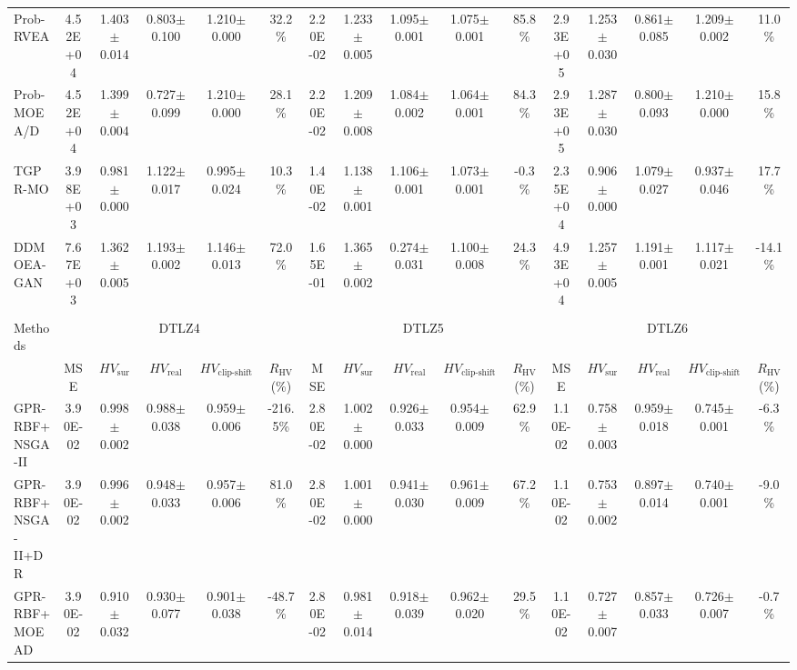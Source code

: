 \begin{table}[htbp]
{\begin{tabular}{l c c c c c c c c c c c c c c c}
Prob-RVEA & 4.52E+04 & 1.403$\pm$0.014 & 0.803$\pm$0.100 & 1.210$\pm$0.000 & 32.2\% & 2.20E-02 & 1.233$\pm$0.005 & 1.095$\pm$0.001 & 1.075$\pm$0.001 & 85.8\% & 2.93E+05 & 1.253$\pm$0.030 & 0.861$\pm$0.085 & 1.209$\pm$0.002 & 11.0\% \\
Prob-MOEA/D & 4.52E+04 & 1.399$\pm$0.004 & 0.727$\pm$0.099 & 1.210$\pm$0.000 & 28.1\% & 2.20E-02 & 1.209$\pm$0.008 & 1.084$\pm$0.002 & 1.064$\pm$0.001 & 84.3\% & 2.93E+05 & 1.287$\pm$0.030 & 0.800$\pm$0.093 & 1.210$\pm$0.000 & 15.8\% \\
TGPR-MO & 3.98E+03 & 0.981$\pm$0.000 & 1.122$\pm$0.017 & 0.995$\pm$0.024 & 10.3\% & 1.40E-02 & 1.138$\pm$0.001 & 1.106$\pm$0.001 & 1.073$\pm$0.001 & -0.3\% & 2.35E+04 & 0.906$\pm$0.000 & 1.079$\pm$0.027 & 0.937$\pm$0.046 & 17.7\% \\
DDMOEA-GAN & 7.67E+03 & 1.362$\pm$0.005 & 1.193$\pm$0.002 & 1.146$\pm$0.013 & 72.0\% & 1.65E-01 & 1.365$\pm$0.002 & 0.274$\pm$0.031 & 1.100$\pm$0.008 & 24.3\% & 4.93E+04 & 1.257$\pm$0.005 & 1.191$\pm$0.001 & 1.117$\pm$0.021 & -14.1\% \\
\hline
\multicolumn{16}{c}{} \\
\hline
Methods & \multicolumn{5}{c}{DTLZ4} & \multicolumn{5}{c}{DTLZ5} & \multicolumn{5}{c}{DTLZ6} \\
\cmidrule(lr){2-6} \cmidrule(lr){7-11} \cmidrule(lr){12-16}
 & MSE & $HV_{\mathrm{sur}}$ & $HV_{\mathrm{real}}$ & $HV_{\mathrm{clip\text{-}shift}}$ & $R_{\mathrm{HV}}$ (\%) & MSE & $HV_{\mathrm{sur}}$ & $HV_{\mathrm{real}}$ & $HV_{\mathrm{clip\text{-}shift}}$ & $R_{\mathrm{HV}}$ (\%) & MSE & $HV_{\mathrm{sur}}$ & $HV_{\mathrm{real}}$ & $HV_{\mathrm{clip\text{-}shift}}$ & $R_{\mathrm{HV}}$ (\%) \\
\hline
GPR-RBF+NSGA-II & 3.90E-02 & 0.998$\pm$0.002 & 0.988$\pm$0.038 & 0.959$\pm$0.006 & -216.5\% & 2.80E-02 & 1.002$\pm$0.000 & 0.926$\pm$0.033 & 0.954$\pm$0.009 & 62.9\% & 1.10E-02 & 0.758$\pm$0.003 & 0.959$\pm$0.018 & 0.745$\pm$0.001 & -6.3\% \\
GPR-RBF+NSGA-II+DR & 3.90E-02 & 0.996$\pm$0.002 & 0.948$\pm$0.033 & 0.957$\pm$0.006 & 81.0\% & 2.80E-02 & 1.001$\pm$0.000 & 0.941$\pm$0.030 & 0.961$\pm$0.009 & 67.2\% & 1.10E-02 & 0.753$\pm$0.002 & 0.897$\pm$0.014 & 0.740$\pm$0.001 & -9.0\% \\
GPR-RBF+MOEAD & 3.90E-02 & 0.910$\pm$0.032 & 0.930$\pm$0.077 & 0.901$\pm$0.038 & -48.7\% & 2.80E-02 & 0.981$\pm$0.014 & 0.918$\pm$0.039 & 0.962$\pm$0.020 & 29.5\% & 1.10E-02 & 0.727$\pm$0.007 & 0.857$\pm$0.033 & 0.726$\pm$0.007 & -0.7\% \\

\end{tabular}}
\end{table}
